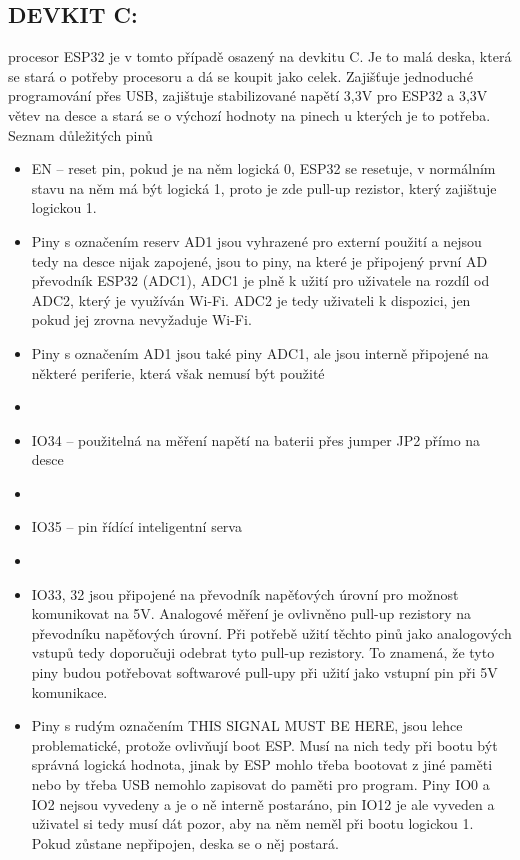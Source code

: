 \documentclass{template/socthesis}
\begin{document}
	\subsection*{DEVKIT C:}
	procesor ESP32 je v tomto případě osazený na devkitu C. Je to malá deska, která se stará o potřeby procesoru a dá se koupit jako celek. Zajišťuje jednoduché programování přes USB, zajištuje stabilizované napětí 3,3V pro ESP32 a 3,3V větev na desce a stará se o výchozí hodnoty na pinech u kterých je to potřeba.
	Seznam důležitých pinů
	\begin{itemize}
	\item EN – reset pin, pokud je na něm logická 0, ESP32 se resetuje, v normálním stavu na něm má být logická 1, proto je zde pull-up rezistor, který zajištuje logickou 1.
	
	\item Piny s označením reserv AD1 jsou vyhrazené pro externí použití 
	a nejsou tedy na desce nijak zapojené, jsou to piny, na které je připojený 
	první AD převodník ESP32 (ADC1), ADC1 je plně k užití pro uživatele na rozdíl 
	od ADC2, který je využíván Wi-Fi. ADC2 je tedy uživateli k dispozici, jen pokud jej zrovna nevyžaduje Wi-Fi.
	
	\item Piny s označením AD1 jsou také piny ADC1, ale jsou interně připojené na některé periferie, která však nemusí být použité
	
	\item \item IO34 – použitelná na měření napětí na baterii přes jumper JP2 přímo na desce
	\item \item IO35 – pin řídící inteligentní serva
	\item \item IO33, 32 jsou připojené na převodník napěťových úrovní pro možnost komunikovat na 5V. Analogové měření je ovlivněno pull-up rezistory na převodníku napěťových úrovní. Při potřebě užití těchto pinů jako analogových vstupů tedy doporučuji odebrat tyto pull-up rezistory. 
	To znamená, že tyto piny budou potřebovat softwarové pull-upy při užití jako vstupní pin při 5V komunikace.
	\item Piny s rudým označením THIS SIGNAL MUST BE HERE, jsou lehce problematické, protože ovlivňují boot ESP. Musí na nich tedy při bootu být správná logická hodnota, jinak by ESP mohlo třeba bootovat z jiné paměti nebo by třeba USB nemohlo zapisovat do paměti pro program. Piny IO0 a IO2 nejsou vyvedeny a je o ně interně postaráno, pin IO12 je ale vyveden a uživatel si tedy musí dát pozor, aby na něm neměl při bootu logickou 1. Pokud zůstane nepřipojen, deska se o něj postará.
	

\end{itemize}
\end{document}
